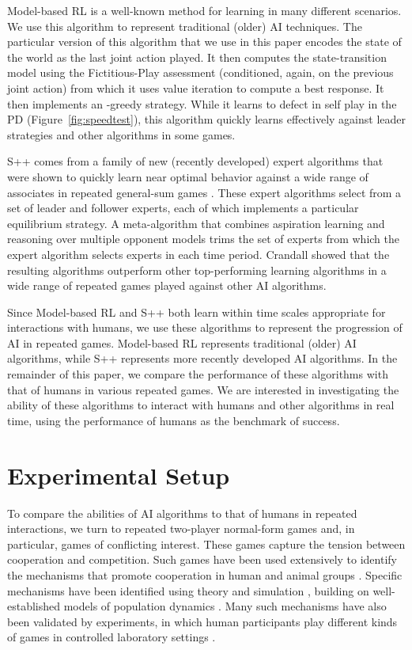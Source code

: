 \documentclass[fleqn,10pt]{SelfArx}
\begin{document}
Model-based RL is a well-known method for learning in many different scenarios.  We use this algorithm to represent traditional (older) AI techniques.  The particular version of this algorithm that we use in this paper encodes the state of the world as the last joint action played.  It then computes the state-transition model using the Fictitious-Play assessment (conditioned, again, on the previous joint action) from which it uses value iteration to compute a best response.  It then implements an -greedy strategy.  While it learns to defect in self play in the PD (Figure~\ref{fig:speedtest}), this algorithm quickly learns effectively against leader strategies \cite{LittmanLeaderAlgs} and other algorithms in some games.

S++ comes from a family of new (recently developed) expert algorithms that were shown to quickly learn near optimal behavior against a wide range of associates in repeated general-sum games \cite{Crandall_JAIR2014}.  These expert algorithms select from a set of leader and follower experts, each of which implements a particular equilibrium strategy.  A meta-algorithm that combines aspiration learning and reasoning over multiple opponent models trims the set of experts from which the expert algorithm selects experts in each time period.  Crandall showed that the resulting algorithms outperform other top-performing learning algorithms in a wide range of repeated games played against other AI algorithms.

Since Model-based RL and S++ both learn within time scales appropriate for interactions with humans, we use these algorithms to represent the progression of AI in repeated games.  Model-based RL represents traditional (older) AI algorithms, while S++ represents more recently developed AI algorithms.  In the remainder of this paper, we compare the performance of these algorithms with that of humans in various repeated games.  We are interested in investigating the ability of these algorithms to interact with humans and other algorithms in real time, using the performance of humans as the benchmark of success.


\section{Experimental Setup}
To compare the abilities of AI algorithms to that of humans in repeated interactions, we turn to repeated two-player normal-form games and, in particular, games of conflicting interest.  These games capture the tension between cooperation and competition. Such games have been used extensively to identify the mechanisms that promote cooperation in human and animal groups \cite{Nowak:etal:2011}. Specific mechanisms have been identified using theory and simulation \cite{Nowak:2006}, building on well-established models of population dynamics \cite{Nowak:2006bk}. Many such mechanisms have also been validated by experiments, in which human participants play different kinds of games in controlled laboratory settings \cite{Fehr:etal:2002,Rand:etal:2009,Rand:etal:2011}.
\end{document}
